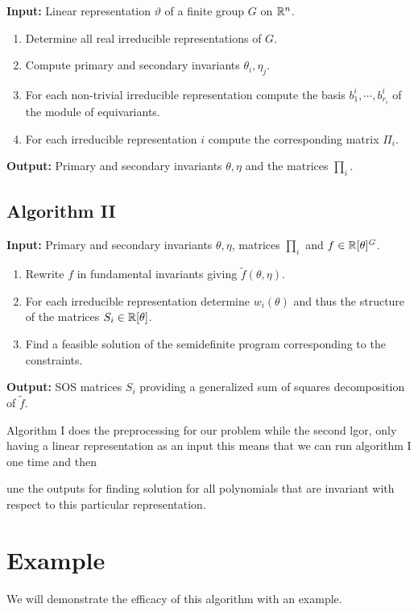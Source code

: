 \documentclass[]{article}
\begin{document}
\textbf{Input:} Linear representation $\vartheta$ of a finite group $G$ on $\mathbb R^n$.

\begin{enumerate}
    \item Determine all real irreducible representations of $G$.
    \item Compute primary and secondary invariants $\theta_i,\eta_j$. 
    \item For each non-trivial irreducible representation compute the basis $b_1^i,\cdots, b_{r_i}^i$ of the module of equivariants.
    \item For each irreducible representation $i$ compute the corresponding matrix $\Pi_i$.
\end{enumerate}
\noindent
\textbf{Output:} Primary and secondary invariants $\theta,\eta$ and the matrices $\prod_i$.

\subsection*{Algorithm II}

\textbf{Input: } Primary and secondary invariants $\theta,\eta$, matrices $\prod_i$ and $f \in \mathbb R[\theta]^G$.

\begin{enumerate}
    \item Rewrite $f$ in fundamental invariants giving $\tilde{f}(\theta,\eta)$.
    \item For each irreducible representation determine $w_i(\theta)$ and thus the structure of the matrices $S_i\in \mathbb R[\theta]$.
    \item Find a feasible solution of the semidefinite program corresponding to the constraints.
\end{enumerate}
\noindent
\textbf{Output:} SOS matrices $S_i$ providing a generalized sum of squares decomposition of $\tilde{f}$.



Algorithm I does the preprocessing for our problem while the second lgor, only having a linear representation as an input
this means that we can run algorithm I one time and then 


une the outputs for finding solution for 
all polynomials that are invariant with respect to this particular representation.


\section{Example}
We will demonstrate the efficacy of this algorithm with an example.
\end{document}
